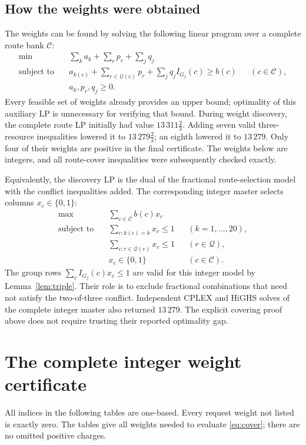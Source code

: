 \documentclass[11pt,a4paper]{article}
\newcommand{\Q}{\mathcal Q}
\begin{document}
\subsection{How the weights were obtained}

The weights can be found by solving the following linear program over a
complete route bank $\mathcal C$:
\begin{align*}
 \min\quad&\sum_k a_k+\sum_r p_r+\sum_j q_j\\
 \text{subject to}\quad&
 a_{k(c)}+\sum_{r\in\Q(c)}p_r+\sum_jq_j I_{G_j}(c)\geq b(c)
       &&(c\in\mathcal C),\\
 &a_k,p_r,q_j\geq0.
\end{align*}
Every feasible set of weights already provides an upper bound; optimality
of this auxiliary LP is unnecessary for verifying that bound. During
weight discovery, the complete route LP initially had value
$13\,311\frac23$. Adding seven valid three-resource inequalities lowered it
to $13\,279\frac23$; an eighth lowered it to $13\,279$. Only four of their
weights are positive in the final certificate. The weights below are integers,
and all route-cover inequalities were subsequently checked exactly.

Equivalently, the discovery LP is the dual of the fractional route-selection
model with the conflict inequalities added. The corresponding integer master
selects columns $x_c\in\{0,1\}$:
\begin{align*}
 \max\quad&\sum_{c\in\mathcal C}b(c)x_c\\
 \text{subject to}\quad&\sum_{c:k(c)=k}x_c\leq1 &&(k=1,\ldots,20),\\
 &\sum_{c:r\in\Q(c)}x_c\leq1 &&(r\in\Q),\\
 &x_c\in\{0,1\} &&(c\in\mathcal C).
\end{align*}
The group rows $\sum_c I_{G_j}(c)x_c\leq1$ are valid for this integer model
by Lemma~\ref{lem:triple}. Their role is to exclude fractional combinations
that need not satisfy the two-of-three conflict. Independent CPLEX and HiGHS
solves of the complete integer master also returned $13\,279$. The explicit
covering proof above does not require trusting their reported optimality gap.

\section{The complete integer weight certificate}\label{sec:certificate}

All indices in the following tables are one-based. Every request weight not
listed is exactly zero. The tables give all weights needed to evaluate
\eqref{eq:cover}; there are no omitted positive charges.
\end{document}
